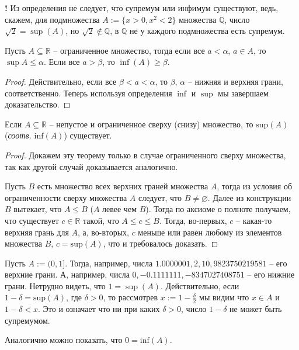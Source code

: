 \begin{mydanger}{\bf{!}}
    Из определения не следует, что супремум или инфимум существуют, ведь, скажем, для подмножества $A:= \{x>0, x^2 < 2\}$ множества $\mathbb{Q}$, число $\sqrt{2} = \sup (A)$, но $\sqrt{2} \notin \mathbb{Q}$, \ie в $\mathbb{Q}$ не у каждого подмножества есть супремум. 
\end{mydanger}

\begin{lemma}\label{simple_lemma}
 Пусть $A \subseteq \mathbb{R}$ -- ограниченное множество, тогда если все $a < \alpha$, $a\in A$, то $\sup A \le \alpha.$ Если все $a > \beta$, то $\inf(A) \ge \beta$. 
\end{lemma}
\begin{proof}
 Действительно, если все $\beta <a< \alpha$, то $\beta$, $\alpha$ -- нижняя и верхняя грани, соответственно. Теперь используя определения $\inf$ и $\sup$ мы завершаем доказательство. 
\end{proof}



\begin{theorem}\label{W=complete}
    Если $A\subseteq \mathbb{R}$ -- непустое и ограниченное сверху (снизу) множество, то $\mathrm{sup}(A)$ (\textit{соотв.} $\mathrm{inf}(A)$) существует.
\end{theorem}
\begin{proof}
    Докажем эту теорему только в случае ограниченного сверху множества, так как другой случай доказывается аналогично.

    Пусть $B$ есть множество всех верхних граней множества $A$, тогда из условия об ограниченности сверху множества $A$ следует, что $B \ne \varnothing$. Далее из конструкции $B$ вытекает, что $A\le B$ (\ie $A$ левее чем $B$). Тогда по аксиоме о полноте получаем, что существует $c \in \mathbb{R}$ такой, что $A \le c \le B$. Тогда, во-первых, $c$ -- какая-то верхняя грань для $A$, а, во-вторых, $c$ меньше или равен  любому из элементов множества $B$, \ie $c = \mathrm{sup}(A)$, что и требовалось доказать.
\end{proof}



\begin{example}
    Пусть $A := (0,1]$. Тогда, например, числа $1.0000001, 2, 10, 9823750219581$ -- его верхние грани. А, например, числа $0, -0.1111111, -8347027408751$ -- его нижние грани.
Нетрудно видеть, что $1 = \sup(A)$. Действительно, если $1-\delta = \mathrm{sup}(A)$, где $\delta > 0$,  то рассмотрев $x:=1-\frac{\delta}{2}$ мы видим что $x\in A$ и $1-\delta < x$. Это и означает что ни при каких $\delta >0$, число $1 - \delta$ не может быть супремумом.

Аналогично можно показать, что $0 = \mathrm{inf}(A).$
\end{example}





